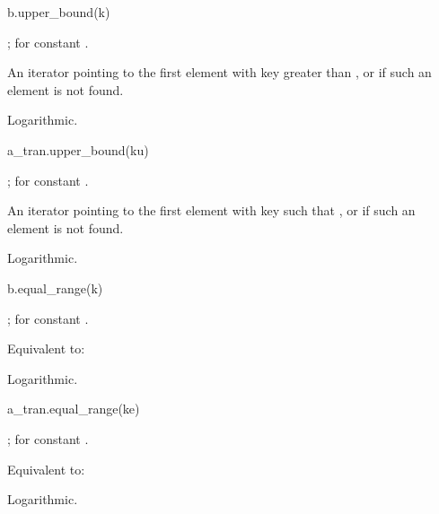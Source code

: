 %
\begin{itemdecl}
b.upper_bound(k)
\end{itemdecl}

\begin{itemdescr}
\pnum
\result
{};  for constant .

\pnum
\returns
An iterator pointing to the first element with key greater than ,
or  if such an element is not found.

\pnum
\complexity
Logarithmic.
\end{itemdescr}

%
\begin{itemdecl}
a_tran.upper_bound(ku)
\end{itemdecl}

\begin{itemdescr}
\pnum
\result
{};  for constant .

\pnum
\returns
An iterator pointing to the first element with key 
such that ,
or  if such an element is not found.

\pnum
\complexity
Logarithmic.
\end{itemdescr}

%
\begin{itemdecl}
b.equal_range(k)
\end{itemdecl}

\begin{itemdescr}
\pnum
\result
{};
 for constant .

\pnum
\effects
Equivalent to: 

\pnum
\complexity
Logarithmic.
\end{itemdescr}

%
\begin{itemdecl}
a_tran.equal_range(ke)
\end{itemdecl}

\begin{itemdescr}
\pnum
\result
{};
 for constant .

\pnum
\effects
Equivalent to:

\pnum
\complexity
Logarithmic.
\end{itemdescr}

